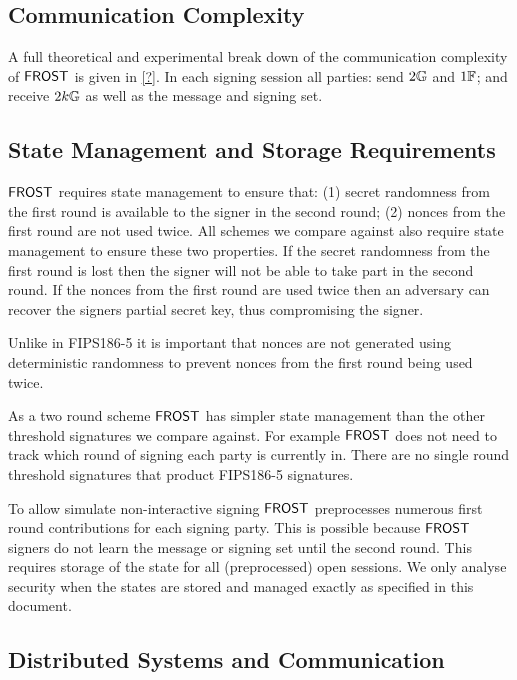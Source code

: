 \subsection{Communication Complexity}\label{section:comparisons:communicationcomplexity}
A full theoretical and experimental break down of the communication complexity of $\mathsf{FROST}$ is given in \cref{?}.
In each signing session all parties:  send $2 \mathbb{G}$ and $1 \mathbb{F}$; and receive $2 k \mathbb{G}$ as well as the message and signing set.

\subsection{State Management and Storage Requirements}
$\mathsf{FROST}$ requires state management to ensure that:
(1) secret randomness from the first round is available to the signer in the second round;
(2) nonces from the first round are not used twice.
All schemes we compare against also require state management to ensure these two properties.
If the secret randomness from the first round is lost then the signer will not be able to take part in the second round.
If the nonces from the first round are used twice then an adversary can recover the signers partial secret key,
thus compromising the signer.

Unlike in FIPS186-5 it is important that nonces are not generated using deterministic randomness to prevent nonces from the first round being used twice.

As a two round scheme $\mathsf{FROST}$ has simpler state management than the other threshold signatures we compare against.
For example $\mathsf{FROST}$ does not need to track which round of signing each party is currently in.
There are no single round threshold signatures that product FIPS186-5 signatures.

To allow simulate non-interactive signing $\mathsf{FROST}$ preprocesses numerous first round contributions for each signing party.
This is possible because $\mathsf{FROST}$ signers do not learn the message or signing set until the second round.
This requires storage of the state for all (preprocessed) open sessions.
We only analyse security when the states are stored and managed exactly as specified in this document.

\subsection{Distributed Systems and Communication}



